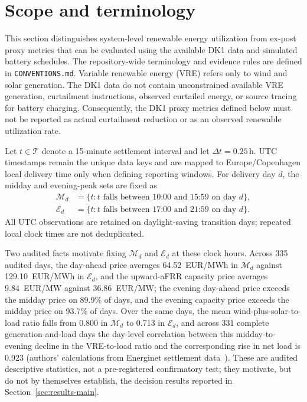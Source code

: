 \documentclass[11pt,a4paper]{article}
\begin{document}
\section{Scope and terminology}

This section distinguishes system-level renewable energy utilization from ex-post proxy metrics that can be evaluated using the available DK1 data and simulated battery schedules. The repository-wide terminology and evidence rules are defined in \texttt{CONVENTIONS.md}. Variable renewable energy (VRE) refers only to wind and solar generation. The DK1 data do not contain unconstrained available VRE generation, curtailment instructions, observed curtailed energy, or source tracing for battery charging. Consequently, the DK1 proxy metrics defined below must not be reported as actual curtailment reduction or as an observed renewable utilization rate.

Let $t\in\mathcal{T}$ denote a 15-minute settlement interval and let $\Delta t=0.25\,\mathrm{h}$. UTC timestamps remain the unique data keys and are mapped to Europe/Copenhagen local delivery time only when defining reporting windows. For delivery day $d$, the midday and evening-peak sets are fixed as
\begin{align}
  \mathcal{M}_d
  &=\{t: t\text{ falls between 10:00 and 15:59 on day }d\}, \\
  \mathcal{E}_d
  &=\{t: t\text{ falls between 17:00 and 21:59 on day }d\}.
\end{align}
All UTC observations are retained on daylight-saving transition days; repeated local clock times are not deduplicated.

Two audited facts motivate fixing $\mathcal M_d$ and $\mathcal E_d$ at these
clock hours.  Across 335 audited days, the day-ahead price averages
64.52~EUR/MWh in $\mathcal M_d$ against 129.10~EUR/MWh in $\mathcal E_d$, and
the upward-aFRR capacity price averages 9.84~EUR/MW against 36.86~EUR/MW; the
evening day-ahead price exceeds the midday price on 89.9\% of days, and the
evening capacity price exceeds the midday price on 93.7\% of days.  Over the
same days, the mean wind-plus-solar-to-load ratio falls from 0.800 in
$\mathcal M_d$ to 0.713 in $\mathcal E_d$, and across 331 complete
generation-and-load days the day-level correlation between this
midday-to-evening decline in the VRE-to-load ratio and the corresponding rise
in net load is 0.923 (authors' calculations from Energinet settlement
data~\cite{energineteds}).  These are audited descriptive statistics, not a
pre-registered confirmatory test; they motivate, but do not by themselves
establish, the decision results reported in Section~\ref{sec:results-main}.
\end{document}
